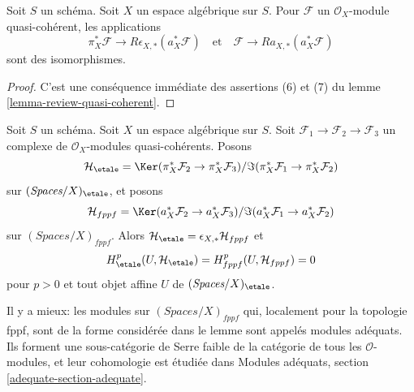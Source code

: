 \begin{lemma}
\label{lemma-cohomological-descent-etale-fppf-modules}
Soit $S$ un schéma. Soit $X$ un espace algébrique sur $S$.
Pour $\mathcal{F}$ un $\mathcal{O}_X$-module quasi-cohérent, les applications
$$
\pi_X^*\mathcal{F} \longrightarrow R\epsilon_{X, *}(a_X^*\mathcal{F})
\quad\text{et}\quad
\mathcal{F} \longrightarrow Ra_{X, *}(a_X^*\mathcal{F})
$$
sont des isomorphismes.
\end{lemma}

\begin{proof}
C'est une conséquence immédiate des assertions (6) et (7) du lemme
\ref{lemma-review-quasi-coherent}.
\end{proof}

\begin{lemma}
\label{lemma-vanishing-adequate}
Soit $S$ un schéma. Soit $X$ un espace algébrique sur $S$.
Soit $\mathcal{F}_1 \to \mathcal{F}_2 \to \mathcal{F}_3$
un complexe de $\mathcal{O}_X$-modules quasi-cohérents.
Posons
$$
\mathcal{H}_\etale =
\Ker(\pi_X^*\mathcal{F}_2 \to \pi_X^*\mathcal{F}_3)/
\Im(\pi_X^*\mathcal{F}_1 \to \pi_X^*\mathcal{F}_2)
$$
sur $(\textit{Spaces}/X)_\etale$, et posons
$$
\mathcal{H}_{fppf} =
\Ker(a_X^*\mathcal{F}_2 \to a_X^*\mathcal{F}_3)/
\Im(a_X^*\mathcal{F}_1 \to a_X^*\mathcal{F}_2)
$$
sur $(\textit{Spaces}/X)_{fppf}$.
Alors $\mathcal{H}_\etale = \epsilon_{X, *}\mathcal{H}_{fppf}$ et
$$
H^p_\etale(U, \mathcal{H}_\etale) = H^p_{fppf}(U, \mathcal{H}_{fppf}) = 0
$$
pour $p > 0$ et tout objet affine $U$ de $(\textit{Spaces}/X)_\etale$.
\end{lemma}

\noindent
Il y a mieux: les modules sur $(\textit{Spaces}/X)_{fppf}$ qui, localement pour
la topologie fppf, sont de la forme considérée dans le lemme sont appelés
modules adéquats. Ils forment une sous-catégorie de Serre faible de la catégorie
de tous les $\mathcal{O}$-modules, et leur cohomologie est étudiée dans Modules
adéquats, section \ref{adequate-section-adequate}.

